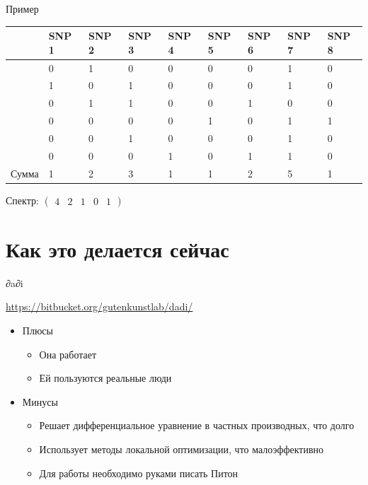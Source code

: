 \documentclass[
  russian,
  ignorenonframetext,
]{beamer}
\providecommand{\tightlist}{%
  \setlength{\itemsep}{0pt}\setlength{\parskip}{0pt}}
\begin{document}
\begin{frame}{Пример}
\protect\hypertarget{ux43fux440ux438ux43cux435ux440}{}

\begin{longtable}[]{@{}lllllllll@{}}
\toprule
& SNP 1 & SNP 2 & SNP 3 & SNP 4 & SNP 5 & SNP 6 & SNP 7 & SNP
8\tabularnewline
\midrule
\endhead
& 0 & 1 & 0 & 0 & 0 & 0 & 1 & 0\tabularnewline
& 1 & 0 & 1 & 0 & 0 & 0 & 1 & 0\tabularnewline
& 0 & 1 & 1 & 0 & 0 & 1 & 0 & 0\tabularnewline
& 0 & 0 & 0 & 0 & 1 & 0 & 1 & 1\tabularnewline
& 0 & 0 & 1 & 0 & 0 & 0 & 1 & 0\tabularnewline
& 0 & 0 & 0 & 1 & 0 & 1 & 1 & 0\tabularnewline
Сумма & 1 & 2 & 3 & 1 & 1 & 2 & 5 & 1\tabularnewline
\bottomrule
\end{longtable}

Спектр: \(\begin{pmatrix}4&2&1&0&1\end{pmatrix}\)

\end{frame}

\hypertarget{ux43aux430ux43a-ux44dux442ux43e-ux434ux435ux43bux430ux435ux442ux441ux44f-ux441ux435ux439ux447ux430ux441}{%
\section{Как это делается
сейчас}\label{ux43aux430ux43a-ux44dux442ux43e-ux434ux435ux43bux430ux435ux442ux441ux44f-ux441ux435ux439ux447ux430ux441}}

\begin{frame}{∂a∂i\ }
\protect\hypertarget{section}{}

\url{https://bitbucket.org/gutenkunstlab/dadi/}

\begin{itemize}
\tightlist
\item
  Плюсы

  \begin{itemize}
  \tightlist
  \item
    Она работает
  \item
    Ей пользуются реальные люди
  \end{itemize}
\item
  Минусы

  \begin{itemize}
  \tightlist
  \item
    Решает дифференциальное уравнение в частных производных, что долго
  \item
    Использует методы локальной оптимизации, что малоэффективно
  \item
    Для работы необходимо руками писать Питон
  \end{itemize}
\end{itemize}

\end{frame}
\end{document}
